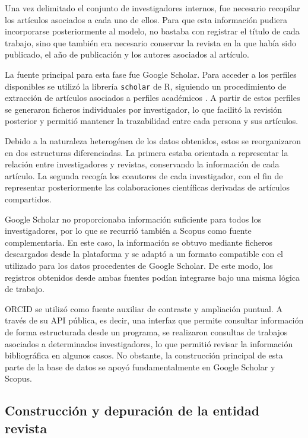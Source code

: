 \documentclass[11pt,spanish,listoffigures,listoftables]{tfgetsinf}
\begin{document}
Una vez delimitado el conjunto de investigadores internos, fue necesario recopilar los artículos asociados a cada uno de ellos. Para que esta información pudiera incorporarse posteriormente al modelo, no bastaba con registrar el título de cada trabajo, sino que también era necesario conservar la revista en la que había sido publicado, el año de publicación y los autores asociados al artículo.

La fuente principal para esta fase fue Google Scholar. Para acceder a los perfiles disponibles se utilizó la librería \texttt{scholar} de R, siguiendo un procedimiento de extracción de artículos asociados a perfiles académicos \cite{r_scholar,beugnon_scholar}. A partir de estos perfiles se generaron ficheros individuales por investigador, lo que facilitó la revisión posterior y permitió mantener la trazabilidad entre cada persona y sus artículos.

Debido a la naturaleza heterogénea de los datos obtenidos, estos se reorganizaron en dos estructuras diferenciadas. La primera estaba orientada a representar la relación entre investigadores y revistas, conservando la información de cada artículo. La segunda recogía los coautores de cada investigador, con el fin de representar posteriormente las colaboraciones científicas derivadas de artículos compartidos.

Google Scholar no proporcionaba información suficiente para todos los investigadores, por lo que se recurrió también a Scopus como fuente complementaria. En este caso, la información se obtuvo mediante ficheros descargados desde la plataforma y se adaptó a un formato compatible con el utilizado para los datos procedentes de Google Scholar. De este modo, los registros obtenidos desde ambas fuentes podían integrarse bajo una misma lógica de trabajo.

ORCID se utilizó como fuente auxiliar de contraste y ampliación puntual. A través de su API pública, es decir, una interfaz que permite consultar información de forma estructurada desde un programa, se realizaron consultas de trabajos asociados a determinados investigadores, lo que permitió revisar la información bibliográfica en algunos casos. No obstante, la construcción principal de esta parte de la base de datos se apoyó fundamentalmente en Google Scholar y Scopus.

\subsection{Construcción y depuración de la entidad revista}
\end{document}
